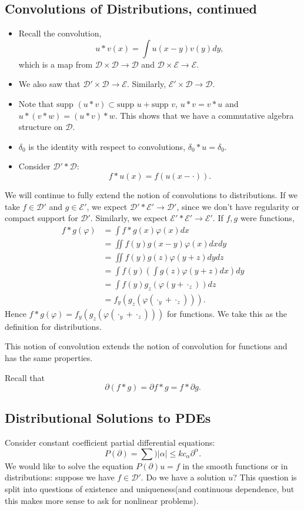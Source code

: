 \documentclass[11pt]{scrartcl}
\let \phi \varphi
\newcommand{\supp}{\text{supp }}
\begin{document}
\subsection{Convolutions of Distributions, continued}
\begin{itemize}
\item Recall the convolution,
$$u * v(x) = \int u(x-y) v(y)dy,$$
which is a map from $\mathcal D \times \mathcal D \rightarrow \mathcal D$ and $\mathcal D \times \mathcal E \rightarrow \mathcal E$.  
\item We also saw that $\mathcal D' \times \mathcal D \rightarrow \mathcal E$.  Similarly, 
$\mathcal E' \times \mathcal D \rightarrow \mathcal D.$
\item Note that $\supp(u * v) \subset \supp u + \supp v$, $u * v = v * u$ and $u*(v*w) = (u*v)*w$.  This shows that we have a commutative algebra structure on $\mathcal D$.
\item $\delta_0$ is the identity with respect to convolutions, $\delta_0 * u = \delta_0$.
\item Consider $\mathcal D' * \mathcal D:$
$$f*u(x) = f(u(x - \cdot)).$$
\end{itemize}
We will continue to fully extend the notion of convolutions to distributions.  If we take $f \in \mathcal D'$ and $g \in \mathcal E'$, we expect $\mathcal D' * \mathcal E' \rightarrow \mathcal D'$, since we don't have regularity or compact support for $\mathcal D'$.  Similarly, we expect $\mathcal E' * \mathcal E' \rightarrow \mathcal E'$.
If $f, g$ were functions,
\begin{align*}
f*g(\phi) &= \int f * g(x)\phi(x)dx\\
&= \iint f(y)g(x-y)\phi(x)dxdy \\
&= \iint f(y)g(z)\phi(y+z) dydz\\
&= \int f(y)\left (\int g(z)\phi(y+z)dx \right )dy\\
&=\int f(y) g_z(\phi(y + \cdot_z)) dz \\ 
&= f_y(g_z(\phi(\cdot_y + \cdot_z))).
\end{align*}
Hence $f*g(\phi) = f_y(g_z(\phi(\cdot_y + \cdot_z)))$ for functions.  We take this as the definition for distributions.
\begin{proposition} This notion of convolution extends the notion of convolution for functions and has the same properties.

Recall that $$\partial (f*g) = \partial f * g = f * \partial g.$$
\end{proposition}
\subsection{Distributional Solutions to PDEs}
Consider constant coefficient partial differential equations:
$$P(\partial) = \sum){|\alpha| \le k} c_\alpha \partial^\alpha.$$
We would like to solve the equation $P(\partial)u = f$ in the smooth functions or in distributions: suppose we have $f \in \mathcal D'$.  Do we have a solution $u$?  This question is split into questions of existence and uniqueness(and continuous dependence, but this makes more sense to ask for nonlinear problems).
\end{document}
